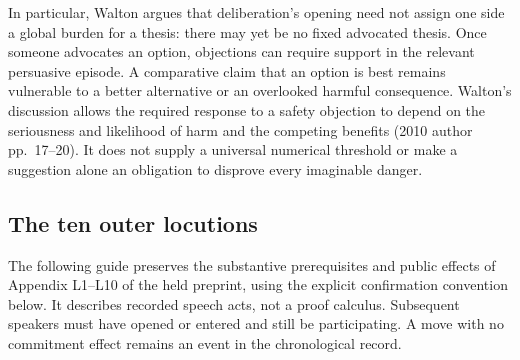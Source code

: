In particular, Walton argues that deliberation's opening need not
assign one side a global burden for a thesis: there may yet be no
fixed advocated thesis. Once someone advocates an option, objections
can require support in the relevant persuasive episode.
A comparative claim that an option is best remains vulnerable to
a better alternative or an overlooked harmful consequence.
Walton's discussion allows the required response to a safety objection
to depend on the seriousness and likelihood of harm and the competing
benefits (2010 author pp.~17--20). It does not supply a universal
numerical threshold or make a suggestion alone an obligation to
disprove every imaginable danger.

\subsection{The ten outer locutions}

The following guide preserves the substantive prerequisites and public
effects of Appendix L1--L10 of the held preprint, using the explicit
confirmation convention below. It describes recorded speech acts,
not a proof calculus. Subsequent speakers must have opened or entered
and still be participating. A move with no commitment effect remains
an event in the chronological record.

